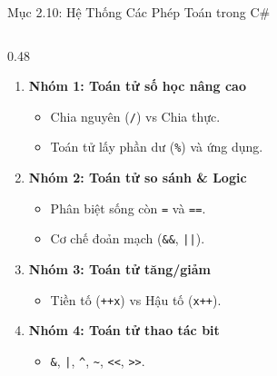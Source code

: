 \documentclass[aspectratio=169, 10pt]{beamer}
\begin{document}
\begin{frame}{Mục 2.10: Hệ Thống Các Phép Toán trong C\#}
\begin{columns}[T]
    \begin{column}{0.48\textwidth}
      \begin{tcolorbox}[colback=UniNavy!5,colframe=UniNavy,title=\textbf{4 Nhóm Toán tử Nòng cốt Buổi 4},fonttitle=\small\bfseries]
        \begin{enumerate}\small
          \item \textbf{Nhóm 1: Toán tử số học nâng cao}
            \begin{itemize}\footnotesize
              \item Chia nguyên (\texttt{/}) vs Chia thực.
              \item Toán tử lấy phần dư (\texttt{\%}) và ứng dụng.
            \end{itemize}
          \item \textbf{Nhóm 2: Toán tử so sánh \& Logic}
            \begin{itemize}\footnotesize
              \item Phân biệt sống còn \texttt{=} và \texttt{==}.
              \item Cơ chế đoản mạch (\texttt{\&\&}, \texttt{||}).
            \end{itemize}
          \item \textbf{Nhóm 3: Toán tử tăng/giảm}
            \begin{itemize}\footnotesize
              \item Tiền tố (\texttt{++x}) vs Hậu tố (\texttt{x++}).
            \end{itemize}
          \item \textbf{Nhóm 4: Toán tử thao tác bit}
            \begin{itemize}\footnotesize
              \item \texttt{\&}, \texttt{|}, \texttt{\textasciicircum}, \texttt{\textasciitilde}, \texttt{<<}, \texttt{>>}.
            \end{itemize}
        \end{enumerate}
      \end{tcolorbox}
    \end{column}
  \end{columns}
\end{frame}
\end{document}
